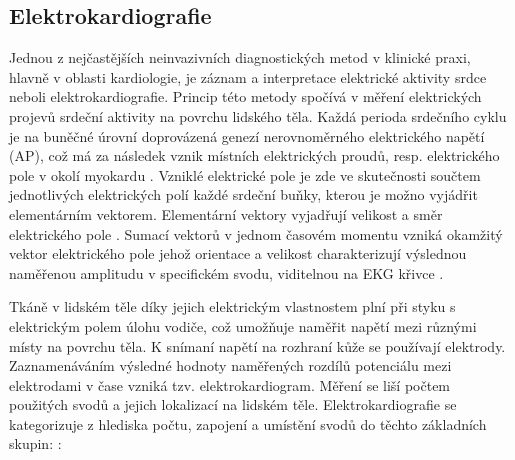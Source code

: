\subsection{Elektrokardiografie}
\label{section:electrocardiography}
Jednou z nejčastějších neinvazivních diagnostických metod v klinické praxi,
hlavně v oblasti kardiologie, je záznam a interpretace elektrické aktivity srdce
neboli elektrokardiografie. Princip této metody spočívá v měření elektrických
projevů srdeční aktivity na povrchu lidského těla. Každá perioda srdečního cyklu
je na buněčné úrovní doprovázená genezí nerovnoměrného elektrického napětí (AP),
což má za následek vznik místních elektrických proudů, resp. elektrického pole v
okolí myokardu \cite{Kittnar2020}. Vzniklé elektrické pole je zde ve skutečnosti
součtem jednotlivých elektrických polí každé srdeční buňky, kterou je možno
vyjádřit elementárním vektorem. Elementární vektory vyjadřují velikost a směr
elektrického pole \cite{Stejfa2006}. Sumací vektorů v jednom časovém momentu
vzniká okamžitý vektor elektrického pole jehož orientace a velikost
charakterizují výslednou naměřenou amplitudu v specifickém svodu, viditelnou na
EKG křivce \cite{Surawicz2008,Kittnar2020}.

Tkáně v lidském těle díky jejich elektrickým vlastnostem plní při styku s
elektrickým polem úlohu vodiče, což umožňuje naměřit napětí mezi různými místy
na povrchu těla. K snímaní napětí na rozhraní kůže se používají elektrody.
Zaznamenáváním výsledné hodnoty naměřených rozdílů potenciálu mezi elektrodami v
čase vzniká tzv. elektrokardiogram. Měření se liší počtem použitých svodů a
jejich lokalizací na lidském těle. Elektrokardiografie se kategorizuje z
hlediska počtu, zapojení a umístění svodů do těchto základních skupin:
\cite{Haberl2012,Kittnar2020}:

